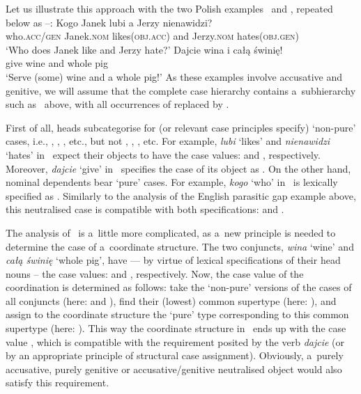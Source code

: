 \documentclass[output=paper]{langsci/langscibook}
\begin{document}
Let us illustrate this approach with the two Polish examples~ and , repeated below as –:
\eal
\label{ex:syn:pc:again} 
\ex
\gll Kogo Janek lubi a Jerzy nienawidzi? \\
    who.\textsc{acc/gen} Janek.\textsc{nom} likes(\textsc{obj.acc}) and Jerzy.\textsc{nom} hates(\textsc{obj.gen})\\
\glt  `Who does Janek like and Jerzy hate?’
\ex\label{ex:dis:pl:again}
\gll Dajcie wina i całą świnię! \\
    give wine\GEN{} and whole\ACC{} pig\ACC{}\\
\glt `Serve (some) wine and a whole pig!’
\zl
As these examples involve accusative and genitive, we will assume that the complete case hierarchy contains a~subhierarchy such as~ above, with all occurrences of  replaced by .

First of all, heads subcategorise for (or relevant case principles specify) `non-pure’ cases, i.e., , , , etc., but not , , , etc.  For example, \emph{lubi} `likes’ and \emph{nienawidzi} `hates’ in~ expect their objects to have the case values:  and , respectively.  Moreover, \emph{dajcie} `give’ in~ specifies the case of its object as .  On the other hand, nominal dependents bear `pure’ cases.  For example, \emph{kogo} `who’ in~ is lexically specified as .  Similarly to the analysis of the English parasitic gap example above, this neutralised case is compatible with both specifications:  and .

The analysis of~ is a~little more complicated, as a~new principle is needed to determine the case of a~coordinate structure.  The two conjuncts, \emph{wina} `wine’ and \emph{całą świnię} `whole pig’, have — by virtue of lexical specifications of their head nouns – the case values:  and , respectively.  Now, the case value of the coordination is determined as follows: take the `non-pure’ versions of the cases of all conjuncts (here:  and ), find their (lowest) common supertype (here: ), and assign to the coordinate structure the `pure’ type corresponding to this common supertype (here: ).  This way the coordinate structure in~ ends up with the case value , which is compatible with the  requirement posited by the verb \emph{dajcie} (or by an appropriate principle of structural case assignment).  Obviously, a~purely accusative, purely genitive or accusative/genitive neutralised object would also satisfy this requirement.
\end{document}
